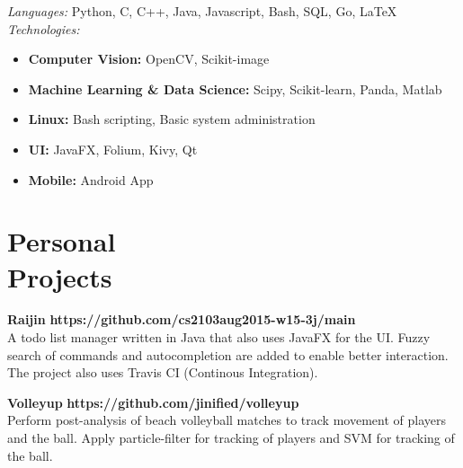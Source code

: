 \documentclass[margin,line]{resume}
\begin{document}
\begin{resume}
    \emph{Languages:} Python, C, C++, Java, Javascript, Bash, SQL, Go, \LaTeX \\
    \emph{Technologies:} \\
    \begin{itemize}
      \item \textbf{Computer Vision:} OpenCV, Scikit-image
      \item \textbf{Machine Learning \& Data Science:} Scipy, Scikit-learn,
        Panda, Matlab
      \item \textbf{Linux:} Bash scripting, Basic system administration
      \item \textbf{UI:} JavaFX, Folium, Kivy, Qt
      \item \textbf{Mobile:} Android App

    \end{itemize}

    \section{\mysidestyle Personal\\Projects}

    \textbf{Raijin} \hfill \textbf{https://github.com/cs2103aug2015-w15-3j/main} \\ 
    A todo list manager written in Java that also uses JavaFX for the UI. Fuzzy
    search of commands and autocompletion are added to enable better
    interaction. The project also uses Travis CI (Continous Integration).

    \textbf{Volleyup} \hfill \textbf{https://github.com/jinified/volleyup} \\
    Perform post-analysis of beach volleyball matches to track movement of
    players and the ball. Apply particle-filter for tracking of players and SVM
    for tracking of the ball.

\end{resume}
\end{document}
